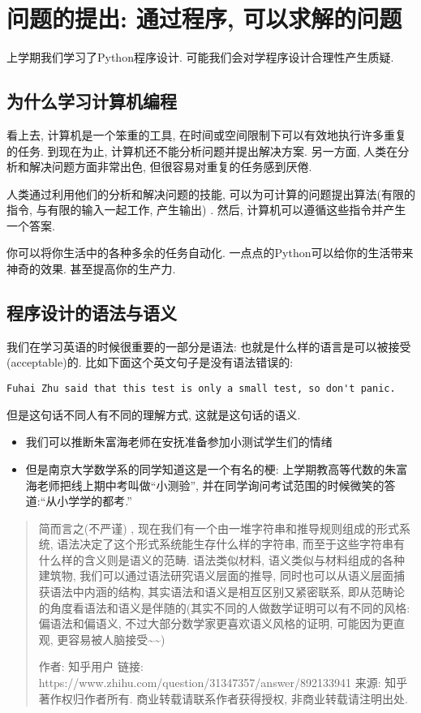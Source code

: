 \section{问题的提出: 通过程序, 可以求解的问题}

上学期我们学习了Python程序设计. 可能我们会对学程序设计合理性产生质疑. 
\subsection{为什么学习计算机编程}
看上去, 计算机是一个笨重的工具, 在时间或空间限制下可以有效地执行许多重复的任务. 到现在为止, 计算机还不能分析问题并提出解决方案. 另一方面,
人类在分析和解决问题方面非常出色, 但很容易对重复的任务感到厌倦. 

人类通过利用他们的分析和解决问题的技能, 可以为可计算的问题提出算法(有限的指令, 与有限的输入一起工作, 产生输出) . 然后,
计算机可以遵循这些指令并产生一个答案. 

你可以将你生活中的各种多余的任务自动化. 一点点的Python可以给你的生活带来神奇的效果. 甚至提高你的生产力. 

\subsection{程序设计的语法与语义}

我们在学习英语的时候很重要的一部分是语法: 也就是什么样的语言是可以被接受(acceptable)的. 比如下面这个英文句子是没有语法错误的: 
\begin{verbatim}
Fuhai Zhu said that this test is only a small test, so don't panic.
\end{verbatim}
但是这句话不同人有不同的理解方式, 这就是这句话的语义. 
\begin{itemize}
\item 我们可以推断朱富海老师在安抚准备参加小测试学生们的情绪
\item 但是南京大学数学系的同学知道这是一个有名的梗: 上学期教高等代数的朱富海老师把线上期中考叫做``小测验'', 并在同学询问考试范围的时候微笑的答道:``从小学学的都考.''
\end{itemize}
\begin{quote}
简而言之(不严谨) , 现在我们有一个由一堆字符串和推导规则组成的形式系统, 语法决定了这个形式系统能生存什么样的字符串, 而至于这些字符串有什么样的含义则是语义的范畴.
语法类似材料, 语义类似与材料组成的各种建筑物, 我们可以通过语法研究语义层面的推导, 同时也可以从语义层面捕获语法中内涵的结构,
其实语法和语义是相互区别又紧密联系, 即从范畴论的角度看语法和语义是伴随的(其实不同的人做数学证明可以有不同的风格: 偏语法和偏语义,
不过大部分数学家更喜欢语义风格的证明, 可能因为更直观, 更容易被人脑接受\textasciitilde\textasciitilde ) 

作者: 知乎用户 链接: https://www.zhihu.com/question/31347357/answer/892133941
来源: 知乎 著作权归作者所有. 商业转载请联系作者获得授权, 非商业转载请注明出处. 
\end{quote}

